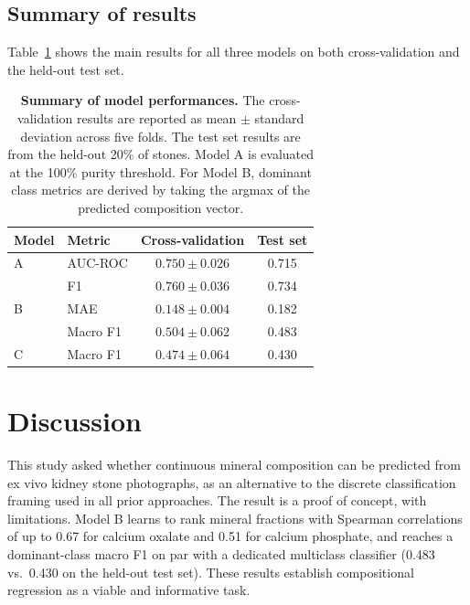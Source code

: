\documentclass[10pt,twocolumn]{article}
\begin{document}
\subsection*{Summary of results}

Table~\ref{tab:summary} shows the main results for all three models on both cross-validation and the held-out test set.

\begin{table}[ht]
    \centering
    \caption{\textbf{Summary of model performances.} The cross-validation results are reported as mean $\pm$ standard deviation across five folds. The test set results are from the held-out 20\% of stones. Model A is evaluated at the 100\% purity threshold. For Model B, dominant class metrics are derived by taking the argmax of the predicted composition vector.}
    \label{tab:summary}
    \begin{tabular}{llcc}
        \toprule
        Model & Metric & Cross-validation & Test set \\
        \midrule
        A & AUC-ROC & $0.750 \pm 0.026$ & 0.715 \\
                         & F1      & $0.760 \pm 0.036$ & 0.734 \\
        \midrule
        B & MAE    & $0.148 \pm 0.004$ & 0.182 \\
                         & Macro F1 & $0.504 \pm 0.062$ & 0.483 \\
        \midrule
        C & Macro F1 & $0.474 \pm 0.064$ & 0.430 \\
        \bottomrule
    \end{tabular}
\end{table}

\FloatBarrier
\section*{Discussion}
 
This study asked whether continuous mineral composition can be predicted from ex vivo kidney stone photographs, as an alternative to the discrete classification framing used in all prior approaches. The result is a proof of concept, with limitations. Model B learns to rank mineral fractions with Spearman correlations of up to 0.67 for calcium oxalate and 0.51 for calcium phosphate, and reaches a dominant-class macro F1 on par with a dedicated multiclass classifier (0.483 vs.\ 0.430 on the held-out test set). These results establish compositional regression as a viable and informative task.
\end{document}
